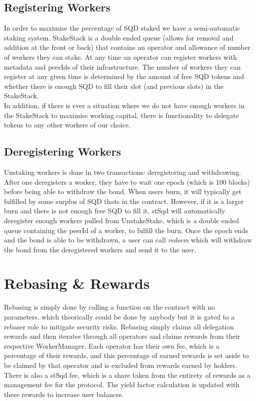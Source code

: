 \documentclass{article}
\begin{document}
\subsection{Registering Workers}
In order to maximise the percentage of SQD staked we have a semi-automatic staking system. StakeStack is a double ended queue (allows for removal and addition at the front or back) that contains an operator and allowance of number of workers they can stake. At any time an operator can register workers with metadata and peerIds of their infrastructure. The number of workers they can register at any given time is determined by the amount of free SQD tokens and whether there is enough SQD to fill their slot (and previous slots) in the StakeStack.
\\
In addition, if there is ever a situation where we do not have enough workers in the StakeStack to maximise working capital, there is functionality to delegate tokens to any other workers of our choice.
\subsection{Deregistering Workers}
Unstaking workers is done in two transactions: deregistering and withdrawing. After one deregisters a worker, they have to wait one epoch (which is 100 blocks) before being able to withdraw the bond. When users burn, it will typically get fulfilled by some surplus of SQD thats in the contract. However, if it is a larger burn and there is not enough free SQD to fill it, stSqd will automatically deregister enough workers pulled from UnstakeStake, which is a double ended queue containing the peerId of a worker, to fulfill the burn. Once the epoch ends and the bond is able to be withdrawn, a user can call \textit{redeem} which will withdraw the bond from the deregistered workers and send it to the user.
\section{Rebasing \& Rewards}
Rebasing is simply done by calling a function on the contract with no parameters, which theorically could be done by anybody but it is gated to a rebaser role to mitigate security risks. Rebasing simply claims all delegation rewards and then iterates through all operators and claims rewards from their respective WorkerManager. Each operator has their own fee, which is a percentage of their rewards, and this percentage of earned rewards is set aside to be claimed by that operator and is excluded from rewards earned by holders. There is also a stSqd fee, which is a share taken from the entirety of rewards as a management fee for the protocol. The yield factor calculation is updated with these rewards to increase user balances.
\end{document}
